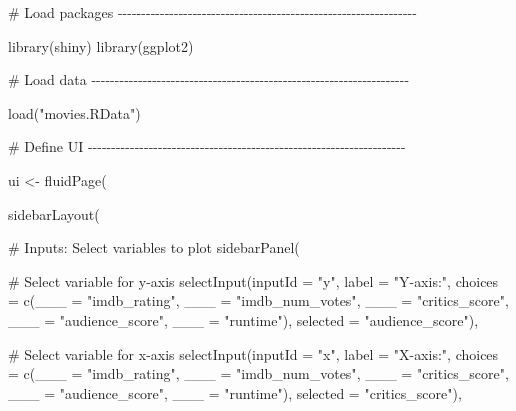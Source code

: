 \documentclass[
  letterpaper,
  DIV=11,
  numbers=noendperiod]{scrreprt}
\newenvironment{Shaded}{\begin{snugshade}}{\end{snugshade}}
\newcommand{\AttributeTok}[1]{\textcolor[rgb]{0.40,0.46,0.14}{#1}}
\newcommand{\CommentTok}[1]{\textcolor[rgb]{0.37,0.37,0.37}{#1}}
\newcommand{\FunctionTok}[1]{\textcolor[rgb]{0.28,0.35,0.67}{#1}}
\newcommand{\NormalTok}[1]{\textcolor[rgb]{0.00,0.46,0.62}{#1}}
\newcommand{\OtherTok}[1]{\textcolor[rgb]{0.00,0.46,0.62}{#1}}
\newcommand{\StringTok}[1]{\textcolor[rgb]{0.13,0.47,0.30}{#1}}
\begin{document}
\begin{Shaded}
\begin{Highlighting}[]
\CommentTok{\# Load packages {-}{-}{-}{-}{-}{-}{-}{-}{-}{-}{-}{-}{-}{-}{-}{-}{-}{-}{-}{-}{-}{-}{-}{-}{-}{-}{-}{-}{-}{-}{-}{-}{-}{-}{-}{-}{-}{-}{-}{-}{-}{-}{-}{-}{-}{-}{-}{-}{-}{-}{-}{-}{-}{-}{-}{-}{-}{-}{-}{-}{-}{-}{-}{-}}

\FunctionTok{library}\NormalTok{(shiny)}
\FunctionTok{library}\NormalTok{(ggplot2)}

\CommentTok{\# Load data {-}{-}{-}{-}{-}{-}{-}{-}{-}{-}{-}{-}{-}{-}{-}{-}{-}{-}{-}{-}{-}{-}{-}{-}{-}{-}{-}{-}{-}{-}{-}{-}{-}{-}{-}{-}{-}{-}{-}{-}{-}{-}{-}{-}{-}{-}{-}{-}{-}{-}{-}{-}{-}{-}{-}{-}{-}{-}{-}{-}{-}{-}{-}{-}{-}{-}{-}{-}}

\FunctionTok{load}\NormalTok{(}\StringTok{"movies.RData"}\NormalTok{)}

\CommentTok{\# Define UI {-}{-}{-}{-}{-}{-}{-}{-}{-}{-}{-}{-}{-}{-}{-}{-}{-}{-}{-}{-}{-}{-}{-}{-}{-}{-}{-}{-}{-}{-}{-}{-}{-}{-}{-}{-}{-}{-}{-}{-}{-}{-}{-}{-}{-}{-}{-}{-}{-}{-}{-}{-}{-}{-}{-}{-}{-}{-}{-}{-}{-}{-}{-}{-}{-}{-}{-}{-}}

\NormalTok{ui }\OtherTok{\textless{}{-}} \FunctionTok{fluidPage}\NormalTok{(}
  
  \FunctionTok{sidebarLayout}\NormalTok{(}
    
    \CommentTok{\# Inputs: Select variables to plot}
    \FunctionTok{sidebarPanel}\NormalTok{(}
      
      \CommentTok{\# Select variable for y{-}axis}
      \FunctionTok{selectInput}\NormalTok{(}\AttributeTok{inputId =} \StringTok{"y"}\NormalTok{, }
                  \AttributeTok{label =} \StringTok{"Y{-}axis:"}\NormalTok{,}
                  \AttributeTok{choices =} \FunctionTok{c}\NormalTok{(}\AttributeTok{\_\_\_ =} \StringTok{"imdb\_rating"}\NormalTok{, }
                              \AttributeTok{\_\_\_ =} \StringTok{"imdb\_num\_votes"}\NormalTok{, }
                              \AttributeTok{\_\_\_ =} \StringTok{"critics\_score"}\NormalTok{, }
                              \AttributeTok{\_\_\_ =} \StringTok{"audience\_score"}\NormalTok{, }
                              \AttributeTok{\_\_\_ =} \StringTok{"runtime"}\NormalTok{), }
                  \AttributeTok{selected =} \StringTok{"audience\_score"}\NormalTok{),}
      
      \CommentTok{\# Select variable for x{-}axis}
      \FunctionTok{selectInput}\NormalTok{(}\AttributeTok{inputId =} \StringTok{"x"}\NormalTok{, }
                  \AttributeTok{label =} \StringTok{"X{-}axis:"}\NormalTok{,}
                  \AttributeTok{choices =} \FunctionTok{c}\NormalTok{(}\AttributeTok{\_\_\_ =} \StringTok{"imdb\_rating"}\NormalTok{, }
                              \AttributeTok{\_\_\_ =} \StringTok{"imdb\_num\_votes"}\NormalTok{, }
                              \AttributeTok{\_\_\_ =} \StringTok{"critics\_score"}\NormalTok{, }
                              \AttributeTok{\_\_\_ =} \StringTok{"audience\_score"}\NormalTok{, }
                              \AttributeTok{\_\_\_ =} \StringTok{"runtime"}\NormalTok{), }
                  \AttributeTok{selected =} \StringTok{"critics\_score"}\NormalTok{),}
      

\end{Highlighting}
\end{Shaded}
\end{document}
